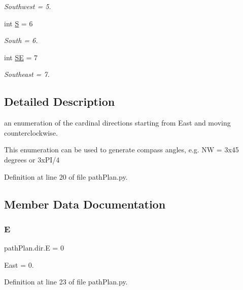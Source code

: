 \begin{DoxyCompactItemize}
\begin{DoxyCompactList}\small\item\em Southwest = 5. \end{DoxyCompactList}\item 
int \mbox{\hyperlink{classpath_plan_1_1dir_adf55896c906c0e87d7f341d893258236}{S}} = 6
\begin{DoxyCompactList}\small\item\em South = 6. \end{DoxyCompactList}\item 
int \mbox{\hyperlink{classpath_plan_1_1dir_a748bd4e686a7a6401bb9ed1a65962244}{SE}} = 7
\begin{DoxyCompactList}\small\item\em Southeast = 7. \end{DoxyCompactList}\end{DoxyCompactItemize}


\subsection{Detailed Description}
an enumeration of the cardinal directions starting from East and moving counterclockwise. 

This enumeration can be used to generate compass angles, e.\+g. NW = 3x45 degrees or 3x\+P\+I/4 

Definition at line 20 of file path\+Plan.\+py.



\subsection{Member Data Documentation}
\mbox{\label{classpath_plan_1_1dir_ace7274c1b8112b1e26f8ad53e611cb55}} 
\subsubsection{\texorpdfstring{E}{E}}
{\footnotesize\ttfamily path\+Plan.\+dir.\+E = 0\hspace{0.3cm}{\ttfamily [static]}}



East = 0. 



Definition at line 23 of file path\+Plan.\+py.

\mbox{\label{classpath_plan_1_1dir_a86f4448228a961438a153a2420fec66b}} 
